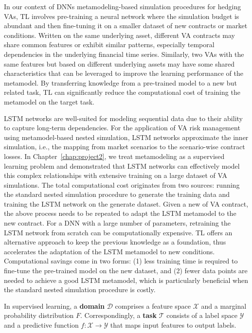 In our context of DNNs metamodeling-based simulation procedures for hedging VAs, TL involves pre-training a neural network where the simulation budget is abundant and then fine-tuning it on a smaller dataset of new contracts or market conditions.
Written on the same underlying asset, different VA contracts may share common features or exhibit similar patterns, especially temporal dependencies in the underlying financial time series.
Similarly, two VAs with the same features but based on different underlying assets may have some shared characteristics that can be leveraged to improve the learning performance of the metamodel.
By transferring knowledge from a pre-trained model to a new but related task, TL can significantly reduce the computational cost of training the metamodel on the target task.

LSTM networks are well-suited for modeling sequential data due to their ability to capture long-term dependencies.
For the application of VA risk management using metamodel-based nested simulation, LSTM networks approximate the inner simulation, i.e., the mapping from market scenarios to the scenario-wise contract losses.
In Chapter~\ref{chap:project2}, we treat metamodeling as a supervised learning problem and demonstrated that LSTM networks can effectively model this complex relationships with extensive training on a large dataset of VA simulations.
The total computational cost originates from two sources: running the standard nested simulation procedure to generate the training data and training the LSTM network on the generate dataset.
Given a new of VA contract, the above process needs to be repeated to adapt the LSTM metamodel to the new contract.
For a DNN with a large number of parameters, retraining the LSTM network from scratch can be computationally expensive.
TL offers an alternative approach to keep the previous knowledge as a foundation, thus accelerates the adaptation of the LSTM metamodel to new conditions.
Computational savings come in two forms: (1) less training time is required to fine-tune the pre-trained model on the new dataset, and (2) fewer data points are needed to achieve a good LSTM metamodel, which is particularly beneficial when the standard nested simulation procedure is costly.

In supervised learning, a \textbf{domain} $\mathcal{D}$ comprises a feature space $\mathcal{X}$ and a marginal probability distribution $F$. Correspondingly, a \textbf{task} $\mathcal{T}$ consists of a label space $\mathcal{Y}$ and a predictive function $f: \mathcal{X} \rightarrow \mathcal{Y}$ that maps input features to output labels.

